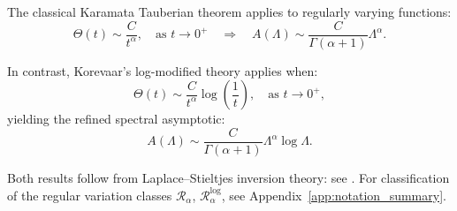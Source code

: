 \begin{remark}
\label{rmk:karamata_vs_korevaar}

The classical Karamata Tauberian theorem applies to regularly varying functions:
\[
\Theta(t) \sim \frac{C}{t^\alpha}, \quad \text{as } t \to 0^+ \quad \Rightarrow \quad A(\Lambda) \sim \frac{C}{\Gamma(\alpha + 1)} \Lambda^\alpha.
\]

In contrast, Korevaar’s log-modified theory applies when:
\[
\Theta(t) \sim \frac{C}{t^\alpha} \log\left( \frac{1}{t} \right), \quad \text{as } t \to 0^+,
\]
yielding the refined spectral asymptotic:
\[
A(\Lambda) \sim \frac{C}{\Gamma(\alpha + 1)} \Lambda^\alpha \log \Lambda.
\]

Both results follow from Laplace–Stieltjes inversion theory: see \cite[Ch.~III, Thm.~3.1 and Thm.~5.5]{Korevaar2004Tauberian}. For classification of the regular variation classes \( \mathcal{R}_\alpha \), \( \mathcal{R}^{\log}_\alpha \), see Appendix~\ref{app:notation_summary}.
\end{remark}
